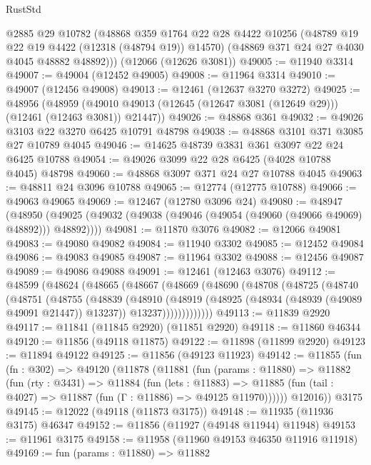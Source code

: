 \begin{lexlean}{RustStd}
\begin{coremodule}
      @2885
      @29
      @10782
      (@48868
        @359
        @1764
        @22
        @28
        @4422
        @10256
        (@48789 @19 @22 @19 @4422 (@12318 (@48794 @19)) @14570)
        (@48869 @371 @24 @27 @4030 @4045 @48882 @48892)))
    (@12066 (@12626 @3081))
@49005 := @11940 @3314
@49007 := @49004 (@12452 @49005)
@49008 := @11964 @3314
@49010 := @49007 (@12456 @49008)
@49013 := @12461 (@12637 @3270 @3272)
@49025 := @48956
    (@48959 (@49010 @49013 (@12645 (@12647 @3081 (@12649 @29))) (@12461 (@12463 @3081)) @21447))
@49026 := @48868 @361
@49032 := @49026 @3103 @22 @3270 @6425 @10791 @48798
@49038 := @48868 @3101 @371 @3085 @27 @10789 @4045
@49046 := @14625 @48739 @3831 @361 @3097 @22 @24 @6425 @10788
@49054 := @49026 @3099 @22 @28 @6425 (@4028 @10788 @4045) @48798
@49060 := @48868 @3097 @371 @24 @27 @10788 @4045
@49063 := @48811 @24 @3096 @10788
@49065 := @12774 (@12775 @10788)
@49066 := @49063 @49065
@49069 := @12467 (@12780 @3096 @24)
@49080 := @48947
    (@48950 (@49025 (@49032 (@49038 (@49046 (@49054 (@49060 (@49066 @49069) @48892))) @48892))))
@49081 := @11870 @3076
@49082 := @12066 @49081
@49083 := @49080 @49082
@49084 := @11940 @3302
@49085 := @12452 @49084
@49086 := @49083 @49085
@49087 := @11964 @3302
@49088 := @12456 @49087
@49089 := @49086 @49088
@49091 := @12461 (@12463 @3076)
@49112 := @48599
    (@48624
      (@48665
        (@48667
          (@48669
            (@48690
              (@48708
                (@48725
                  (@48740
                    (@48751
                      (@48755
                        (@48839
                          (@48910
                            (@48919
                              (@48925 (@48934 (@48939 (@49089 @49091 @21447)) @13237))
                              @13237)))))))))))))
@49113 := @11839 @2920
@49117 := @11841 (@11845 @2920) (@11851 @2920)
@49118 := @11860 @46344
@49120 := @11856 (@49118 @11875)
@49122 := @11898 (@11899 @2920)
@49123 := @11894 @49122
@49125 := @11856 (@49123 @11923)
@49142 := @11855
    (fun (fn : @302) =>
    @49120
      (@11878
        (@11881
          (fun (params : @11880) =>
          @11882
            (fun (rty : @3431) =>
            @11884
              (fun (lets : @11883) =>
              @11885 (fun (tail : @4027) => @11887 (fun (Γ : @11886) => @49125 @11970))))))
        @12016))
    @3175
@49145 := @12022 (@49118 (@11873 @3175))
@49148 := @11935 (@11936 @3175) @46347
@49152 := @11856 (@11927 (@49148 @11944) @11948)
@49153 := @11961 @3175
@49158 := @11958 (@11960 @49153 @46350 @11916 @11918)
@49169 := fun (params : @11880) =>
  @11882

\end{coremodule}
\end{lexlean}
